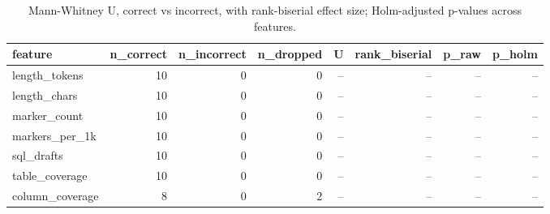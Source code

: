 \begin{table}[htbp]
\caption{Mann-Whitney U, correct vs incorrect, with rank-biserial effect size; Holm-adjusted p-values across features.}
\label{tab:task2_mannwhitney}
\begin{tabular}{lrrrrrrr}
\toprule
feature & n\_correct & n\_incorrect & n\_dropped & U & rank\_biserial & p\_raw & p\_holm \\
\midrule
length_tokens & 10 & 0 & 0 & -- & -- & -- & -- \\
length_chars & 10 & 0 & 0 & -- & -- & -- & -- \\
marker_count & 10 & 0 & 0 & -- & -- & -- & -- \\
markers_per_1k & 10 & 0 & 0 & -- & -- & -- & -- \\
sql_drafts & 10 & 0 & 0 & -- & -- & -- & -- \\
table_coverage & 10 & 0 & 0 & -- & -- & -- & -- \\
column_coverage & 8 & 0 & 2 & -- & -- & -- & -- \\
\bottomrule
\end{tabular}
\end{table}
